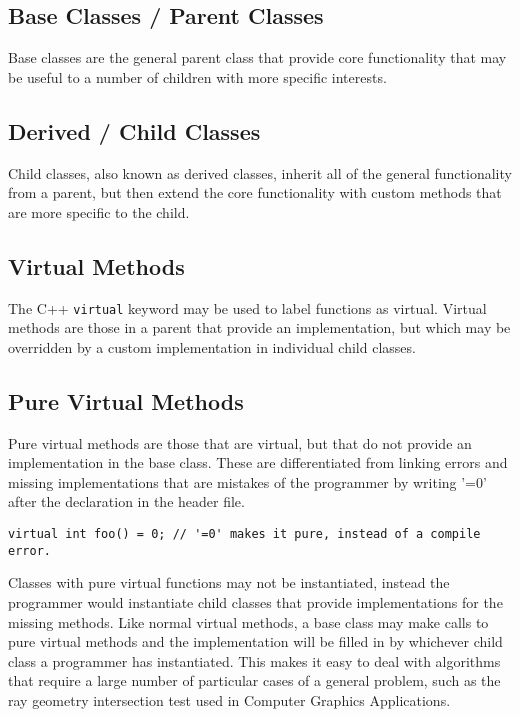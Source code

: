 \documentclass[12pt, letterpaper]{article}
\begin{document}
\subsection{Base Classes / Parent Classes}

Base classes are the general parent class that provide core functionality that may be useful to a number of children with more specific interests.

\subsection{Derived / Child Classes}

Child classes, also known as derived classes, inherit all of the general functionality from a parent, but then extend the core functionality with custom methods that are more specific to the child.

\subsection{Virtual Methods}

The C++ \texttt{virtual} keyword may be used to label functions as virtual. Virtual methods are those in a parent that provide an implementation, but which may be overridden by a custom implementation in individual child classes.

\subsection{Pure Virtual Methods}

Pure virtual methods are those that are virtual, but that do not provide an implementation in the base class. These are differentiated from linking errors and missing implementations that are mistakes of the programmer by writing '=0' after the declaration in the header file.

\begin{verbatim}
virtual int foo() = 0; // '=0' makes it pure, instead of a compile error.
\end{verbatim}

Classes with pure virtual functions may not be instantiated, instead the programmer would instantiate child classes that provide implementations for the missing methods. Like normal virtual methods, a base class may make calls to pure virtual methods and the implementation will be filled in by whichever child class a programmer has instantiated. This makes it easy to deal with algorithms that require a large number of particular cases of a general problem, such as the ray geometry intersection test used in Computer Graphics Applications.
\end{document}
